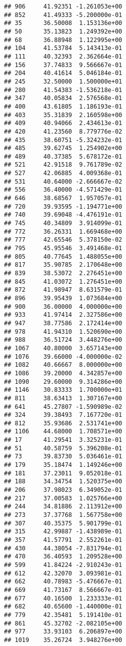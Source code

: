 \documentclass[
]{article}
\begin{document}
\begin{verbatim}
## 906     41.92351 -1.261053e+00
## 852     41.49333 -5.200000e-01
## 35      36.50008  1.153136e+00
## 50      35.13823  1.249392e+00
## 68      36.88948  1.122995e+00
## 104     41.53784  5.143413e-01
## 111     40.32393  2.362664e-01
## 156     37.74833  9.566667e-01
## 204     40.41614  5.046184e-01
## 245     32.50000  1.500000e+01
## 280     41.54383 -1.536218e-01
## 347     40.05834  2.576568e-01
## 400     43.61805  1.186193e-01
## 403     35.31839  2.160598e+00
## 409     40.94066  2.434613e-01
## 420     41.23560  8.779776e-02
## 435     38.60751 -5.324232e-01
## 485     39.62745  1.254902e+00
## 489     40.37385  5.678172e-01
## 521     42.91518  9.761789e-02
## 527     42.06885  4.009368e-01
## 531     40.64000 -2.666667e-02
## 556     36.40000 -4.571429e-01
## 646     38.68567  1.957057e-01
## 720     39.93595 -1.194771e+00
## 740     39.69048 -4.476191e-01
## 745     40.34809  3.914099e-01
## 772     36.26331  1.669468e+00
## 777     42.65546  5.378150e-02
## 795     45.95546  3.491468e-01
## 805     40.77645  1.488055e+00
## 817     35.90785  2.170648e+00
## 839     38.53072  2.276451e+00
## 845     41.03072  1.276451e+00
## 872     41.98947  8.631579e-01
## 896     39.95439  1.073684e+00
## 900     36.00000  4.000000e+00
## 933     41.97414  2.327586e+00
## 947     38.77586  2.172414e+00
## 978     41.94310  1.520690e+00
## 988     36.51724  3.448276e+00
## 1067    40.80000  3.657143e+00
## 1076    39.66000 -4.000000e-02
## 1082    40.66667  8.000000e+00
## 1086    39.20000  4.342857e+00
## 1090    29.60000  9.314286e+00
## 1146    30.83333  1.700000e+01
## 811     38.63413  1.307167e+00
## 641     45.27807 -1.590989e-02
## 324     39.38493  7.167720e-01
## 812     35.93686  2.531741e+00
## 1106    44.68000  1.708571e+00
## 17      41.29541  3.325231e-01
## 51      40.58759  5.396208e-01
## 73      39.83730  5.036461e-01
## 179     35.18474  1.149246e+00
## 181     37.23011  9.052018e-01
## 188     34.34754  1.520375e+00
## 206     37.98023  6.349052e-01
## 217     37.00583  1.025766e+00
## 244     34.81886  2.113912e+00
## 273     37.37768  1.567758e+00
## 307     40.35375  5.901799e-01
## 315     42.99887 -1.438989e-01
## 357     41.57791  2.552261e-01
## 430     44.38054 -7.831794e-01
## 470     36.40593  1.209528e+00
## 599     41.84224 -2.910243e-01
## 612     42.32070  3.093981e-01
## 662     40.78983 -5.476667e-01
## 669     41.73167  8.566667e-01
## 677     40.16500  1.233333e-01
## 682     40.65600 -1.440000e-01
## 779     42.35481  5.191410e-01
## 861     45.32702 -2.082105e+00
## 977     33.93103  6.206897e+00
## 1019    35.26724  3.948276e+00

\end{verbatim}
\end{document}
